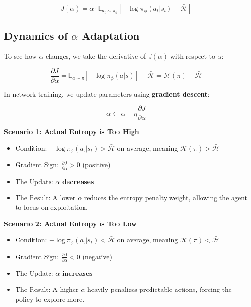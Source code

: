 \documentclass[12pt,a4paper]{article}
\theoremstyle{noteplain}
\theoremstyle{noteexercise}
\begin{document}
\begin{equation}\label{eq:alpha-loss}
\boxed{J(\alpha) = \alpha \cdot \mathbb{E}_{a_t \sim \pi_\phi}\left[-\log\pi_\phi(a_t|s_t) - \bar{\mathcal{H}}\right]}
\end{equation}



\subsection{Dynamics of $\alpha$ Adaptation}\label{ssec:alpha-dynamics}



To see how $\alpha$ changes, we take the derivative of $J(\alpha)$ with respect to $\alpha$:

$$\frac{\partial J}{\partial \alpha} = \mathbb{E}_{a \sim \pi}[-\log\pi_\phi(a|s)] - \bar{\mathcal{H}} = \mathcal{H}(\pi) - \bar{\mathcal{H}}$$

In network training, we update parameters using \textbf{gradient descent}:

$$\alpha \leftarrow \alpha - \eta \frac{\partial J}{\partial \alpha}$$

\textbf{Scenario 1: Actual Entropy is Too High}

\begin{itemize}
  \item Condition: $-\log\pi_\phi(a_t|s_t) > \bar{\mathcal{H}}$ on average, meaning $\mathcal{H}(\pi) > \bar{\mathcal{H}}$
  \item Gradient Sign: $\frac{\partial J}{\partial \alpha} > 0$ (positive)
  \item The Update: $\alpha$ \textbf{decreases}
  \item The Result: A lower $\alpha$ reduces the entropy penalty weight, allowing the agent to focus on exploitation.
\end{itemize}

\textbf{Scenario 2: Actual Entropy is Too Low}

\begin{itemize}
  \item Condition: $-\log\pi_\phi(a_t|s_t) < \bar{\mathcal{H}}$ on average, meaning $\mathcal{H}(\pi) < \bar{\mathcal{H}}$
  \item Gradient Sign: $\frac{\partial J}{\partial \alpha} < 0$ (negative)
  \item The Update: $\alpha$ \textbf{increases}
  \item The Result: A higher $\alpha$ heavily penalizes predictable actions, forcing the policy to explore more.
\end{itemize}
\end{document}
